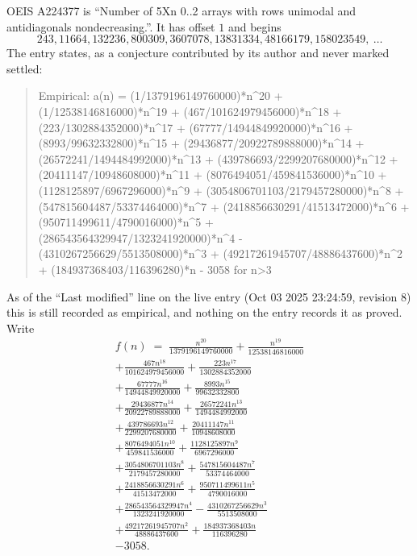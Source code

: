 \documentclass[11pt,a4paper]{article}
\theoremstyle{plain}
\theoremstyle{definition}
\begin{document}
OEIS A224377 is ``Number of 5Xn 0..2 arrays with rows unimodal and antidiagonals nondecreasing.''. It has offset $1$ and begins
\[
243, 11664, 132236, 800309, 3607078, 13831334, 48166179, 158023549,\ \dots
\]
The entry states, as a conjecture contributed by its author and never marked settled:
\begin{quote}\raggedright\small
Empirical: a(n) = (1/1379196149760000)*n\^{}20 + (1/12538146816000)*n\^{}19 + (467/101624979456000)*n\^{}18 + (223/1302884352000)*n\^{}17 + (67777/14944849920000)*n\^{}16 + (8993/99632332800)*n\^{}15 + (29436877/20922789888000)*n\^{}14 + (26572241/1494484992000)*n\^{}13 + (439786693/2299207680000)*n\^{}12 + (20411147/10948608000)*n\^{}11 + (8076494051/459841536000)*n\^{}10 + (1128125897/6967296000)*n\^{}9 + (3054806701103/2179457280000)*n\^{}8 + (547815604487/53374464000)*n\^{}7 + (2418856630291/41513472000)*n\^{}6 + (950711499611/4790016000)*n\^{}5 + (286543564329947/1323241920000)*n\^{}4 - (4310267256629/5513508000)*n\^{}3 + (49217261945707/48886437600)*n\^{}2 + (184937368403/116396280)*n - 3058 for n>3
\end{quote}
As of the ``Last modified'' line on the live entry (Oct 03 2025 23:24:59, revision 8) this is still
recorded as empirical, and nothing on the entry records it as proved. Write
\begin{multline*}
f(n)\;=\;\frac{n^{20}}{1379196149760000} + \frac{n^{19}}{12538146816000} \\
+ \frac{467 n^{18}}{101624979456000} + \frac{223 n^{17}}{1302884352000} \\
+ \frac{67777 n^{16}}{14944849920000} + \frac{8993 n^{15}}{99632332800} \\
+ \frac{29436877 n^{14}}{20922789888000} + \frac{26572241 n^{13}}{1494484992000} \\
+ \frac{439786693 n^{12}}{2299207680000} + \frac{20411147 n^{11}}{10948608000} \\
+ \frac{8076494051 n^{10}}{459841536000} + \frac{1128125897 n^{9}}{6967296000} \\
+ \frac{3054806701103 n^{8}}{2179457280000} + \frac{547815604487 n^{7}}{53374464000} \\
+ \frac{2418856630291 n^{6}}{41513472000} + \frac{950711499611 n^{5}}{4790016000} \\
+ \frac{286543564329947 n^{4}}{1323241920000} - \frac{4310267256629 n^{3}}{5513508000} \\
+ \frac{49217261945707 n^{2}}{48886437600} + \frac{184937368403 n}{116396280} \\
- 3058.
\end{multline*}
\end{document}
